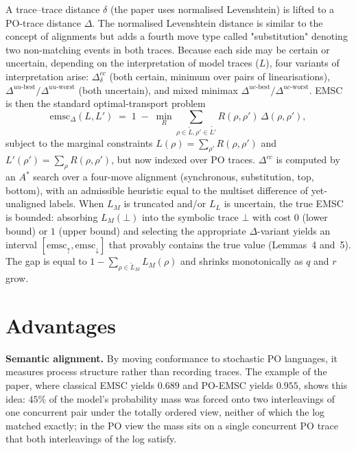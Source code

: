 \documentclass[runningheads]{llncs}
\begin{document}
A trace--trace distance $\delta$ (the paper uses normalised Levenshtein) is lifted to a PO-trace distance $\Delta$. The normalised Levenshtein distance is similar to the concept of alignments but adds a fourth move type called "substitution" denoting two non-matching events in both traces. Because each side may be certain or uncertain, depending on the interpretation of model traces ($L$), four variants of interpretation arise: $\Delta^{cc}_{\delta}$ (both certain, minimum over pairs of linearisations), $\Delta^{uu\text{-}\mathrm{best}}/\Delta^{uu\text{-}\mathrm{worst}}$ (both uncertain), and mixed minimax $\Delta^{uc\text{-}\mathrm{best}}/\Delta^{uc\text{-}\mathrm{worst}}$. EMSC is then the standard optimal-transport problem
\begin{equation}
\mathrm{emsc}_{\Delta}(L, L') \;=\; 1 \;-\; \min_{R} \sum_{\rho \in \tilde{L}, \rho' \in \tilde{L'}} R(\rho, \rho')\,\Delta(\rho, \rho'),
\end{equation}
subject to the marginal constraints $L(\rho) = \sum_{\rho'} R(\rho, \rho')$ and $L'(\rho') = \sum_{\rho} R(\rho, \rho')$, but now indexed over PO traces. $\Delta^{cc}$ is computed by an $A^{*}$ search over a four-move alignment (synchronous, substitution, top, bottom), with an admissible heuristic equal to the multiset difference of yet-unaligned labels. When $L_{M}$ is truncated and/or $L_{L}$ is uncertain, the true EMSC is bounded: absorbing $L_{M}(\bot)$ into the symbolic trace $\bot$ with cost $0$ (lower bound) or $1$ (upper bound) and selecting the appropriate $\Delta$-variant yields an interval $[\mathrm{emsc}_{\uparrow}, \mathrm{emsc}_{\downarrow}]$ that provably contains the true value (Lemmas~4 and~5). The gap is equal to $1 - \sum_{\rho \in \tilde{L}_{M}} L_{M}(\rho)$ and shrinks monotonically as $q$ and $r$ grow.


\section{Advantages}

\noindent\textbf{Semantic alignment.} By moving conformance to stochastic PO languages, it measures process structure rather than recording traces. The example of the paper, where classical EMSC yields $0.689$ and PO-EMSC yields $0.955$, shows this idea: $45\%$ of the model's probability mass was forced onto two interleavings of one concurrent pair under the totally ordered view, neither of which the log matched exactly; in the PO view the mass sits on a single concurrent PO trace that both interleavings of the log satisfy.
\end{document}

